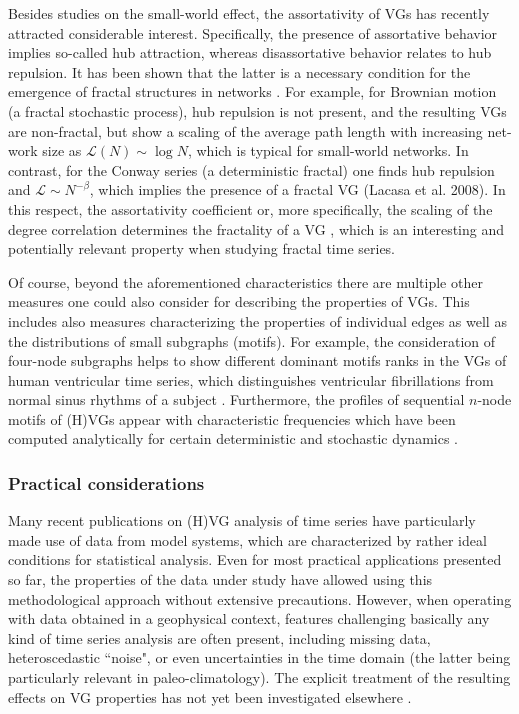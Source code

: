 		Besides studies on the small-world effect, the assortativity of VGs has recently attracted considerable interest. Specifically, the presence of assortative behavior implies so-called hub attraction, whereas disassortative behavior relates to hub repulsion. It has been shown that the latter is a necessary condition for the emergence of fractal structures in networks \cite{Song2006}. For example, for Brownian motion (a fractal stochastic process), hub repulsion is not present, and the resulting VGs are non-fractal, but show a scaling of the average path length with increasing net-work size as $\mathcal{L}(N)\sim \log N$, which is typical for small-world networks. In contrast, for the Conway series (a deterministic fractal) one finds hub repulsion and $\mathcal{L}\sim N^{-\beta}$, which implies the presence of a fractal VG (Lacasa et al. 2008). In this respect, the assortativity coefficient or, more specifically, the scaling of the degree correlation determines the fractality of a VG \cite{Song2006}, which is an interesting and potentially relevant property when studying fractal time series.		
	
		Of course, beyond the aforementioned characteristics there are multiple other measures one could also consider for describing the properties of VGs. This includes also measures characterizing the properties of individual edges as well as the distributions of small subgraphs (motifs). For example, the consideration of four-node subgraphs helps to show different dominant motifs ranks in the VGs of human ventricular time series, which distinguishes ventricular fibrillations from normal sinus rhythms of a subject \cite{Li2011}. Furthermore, the profiles of sequential $n$-node motifs of (H)VGs appear with characteristic frequencies which have been computed analytically for certain deterministic and stochastic dynamics \cite{Iacovacci2016}. 
		
		\subsubsection{Practical considerations}
		Many recent publications on (H)VG analysis of time series have particularly made use of data from model systems, which are characterized by rather ideal conditions for statistical analysis. Even for most practical applications presented so far, the properties of the data under study have allowed using this methodological approach without extensive precautions. However, when operating with data obtained in a geophysical context, features challenging basically any kind of time series analysis are often present, including missing data, heteroscedastic ``noise", or even uncertainties in the time domain (the latter being particularly relevant in paleo-climatology). The explicit treatment of the resulting effects on VG properties has not yet been investigated elsewhere \cite{Donner2012}. 

